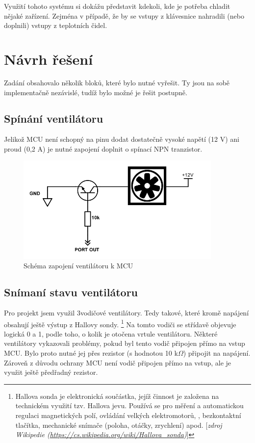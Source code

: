 \documentclass[11pt,a4paper,onecolumn,notitlepage]{article}
\begin{document}
	Využití tohoto systému si dokážu představit kdekoli, kde je potřeba chladit nějaké zařízení. Zejména v případě, že by se vstupy z klávesnice nahradili (nebo doplnili) vstupy z teplotních čidel.
	

\section{Návrh řešení}
Zadání obsahovalo několik bloků, které bylo nutné vyřešit. Ty jsou na sobě implementačně nezávislé, tudíž bylo možné je řešit postupně.
	
	\subsection{Spínání ventilátoru}
	Jelikož MCU není schopný na pinu dodat dostatečně vysoké napětí (12 V) ani proud (0,2 A) je nutné zapojení doplnit o spínací NPN tranzistor.
	\begin{figure}[hb]
		\centering
		\includegraphics[width=0.9\textwidth]{fan.png}
		\caption{Schéma zapojení ventilátoru k MCU}
		\label{fig:fan}
	\end{figure}

	\subsection{Snímaní stavu ventilátoru}
	Pro projekt jsem využil 3vodičové ventilátory. Tedy takové, které kromě napájení obsahují ještě výstup z Hallovy sondy.
	\footnote{Hallova sonda je elektronická součástka, jejíž činnost je založena na technickém využití tzv. Hallova jevu. Používá se pro měření a automatickou regulaci magnetických polí, ovládání velkých elektromotorů, , bezkontaktní tlačítka, mechanické snímače (poloha, otáčky, zrychlení) apod. [\emph{zdroj Wikipedie (\url{https://cs.wikipedia.org/wiki/Hallova_sonda})}]}
	Na tomto vodiči se střídavě objevuje logická 0 a 1, podle toho, o kolik je otočena vrtule ventilátoru.
	Některé ventilátory vykazovali problémy, pokud byl tento vodič připojen přímo na vstup MCU. Bylo proto nutné jej přes rezistor (s hodnotou 10 k$\Omega$) připojit na napájení. Zároveň z důvodu ochrany MCU není vodič připojen přímo na vstup, ale je využit ještě předřadný rezistor.
	
\end{document}
